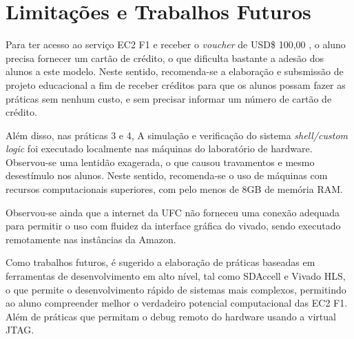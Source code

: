 \section{Limitações e Trabalhos Futuros}\label{sec:limitacoes-e-trabalhos-futuros}
Para ter acesso ao serviço EC2 F1 e receber o \textit{voucher} de USD\$ 100,00 , o aluno precisa fornecer um cartão de crédito, o que dificulta bastante a adesão dos alunos a este modelo. Neste sentido, recomenda-se a elaboração e subsmissão de projeto educacional a fim de receber créditos para que os alunos possam fazer as práticas sem nenhum custo, e sem precisar informar um número de cartão de crédito.

Além disso, nas práticas 3 e 4, A simulação e verificação do sistema \textit{shell/custom logic} foi executado localmente nas máquinas do laboratório de hardware. Observou-se uma lentidão exagerada, o que causou travamentos e mesmo desestímulo nos alunos. Neste sentido, recomenda-se o uso de máquinas com recursos computacionais superiores, com pelo menos de 8GB de memória RAM. 

Observou-se ainda que a internet da UFC não forneceu uma conexão adequada para permitir o uso com fluidez da interface gráfica do vivado, sendo executado remotamente nas instâncias da Amazon.

Como trabalhos futuros, é sugerido a elaboração de práticas baseadas em ferramentas de desenvolvimento em alto nível, tal como SDAccell e Vivado HLS, o que permite o desenvolvimento rápido de sistemas mais complexos, permitindo ao aluno compreender melhor o verdadeiro potencial computacional das EC2 F1. Além de práticas que permitam o debug remoto do hardware usando a virtual JTAG.







